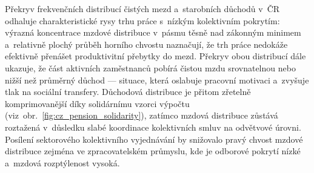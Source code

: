 Překryv frekvenčních distribucí čistých mezd a~starobních důchodů v~ČR odhaluje charakteristické rysy trhu práce s~nízkým kolektivním pokrytím: výrazná koncentrace mzdové distribuce v~pásmu těsně nad zákonným minimem a~relativně plochý průběh horního chvostu naznačují, že trh práce nedokáže efektivně přenášet produktivitní přebytky do mezd.
Překryv obou distribucí dále ukazuje, že část aktivních zaměstnanců pobírá čistou mzdu srovnatelnou nebo nižší než průměrný důchod --- situace, která oslabuje pracovní motivaci a~zvyšuje tlak na sociální transfery.
Důchodová distribuce je přitom zřetelně komprimovanější díky solidárnímu vzorci výpočtu (viz~obr.~\ref{fig:cz_pension_solidarity}), zatímco mzdová distribuce zůstává roztažená v~důsledku slabé koordinace kolektivních smluv na odvětvové úrovni.
Posílení sektorového kolektivního vyjednávání by snižovalo pravý chvost mzdové distribuce zejména ve zpracovatelském průmyslu, kde je odborové pokrytí nízké a~mzdová rozptýlenost vysoká.


